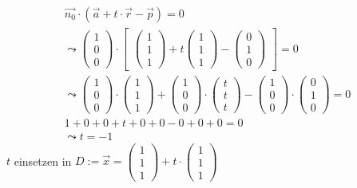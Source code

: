 \begin{gather}
\vec{n_0} \cdot (\vec{a}+t\cdot \vec{r}-\vec{p})=0\\
\leadsto 
\begin{pmatrix}
1\\0\\0
\end{pmatrix} \cdot 
\begin{bmatrix}
\begin{pmatrix}
1\\1\\1
\end{pmatrix}
+ t
\begin{pmatrix}
1\\1\\1
\end{pmatrix}
-
\begin{pmatrix}
0\\1\\0
\end{pmatrix}
\end{bmatrix} = 0\\
\leadsto
\begin{pmatrix}
1\\0\\0
\end{pmatrix}\cdot
\begin{pmatrix}
1\\1\\1
\end{pmatrix}
+
\begin{pmatrix}
1\\0\\0
\end{pmatrix}
\cdot
\begin{pmatrix}
t\\t\\t
\end{pmatrix}
-
\begin{pmatrix}
1\\0\\0
\end{pmatrix}
\cdot
\begin{pmatrix}
0\\1\\0
\end{pmatrix} =0\\
1+0+0+t+0+0-0+0+0=0\\
\leadsto t=-1
\end{gather} 
\ensuremath{t} einsetzen in \ensuremath{D:= \vec{x}=\begin{pmatrix}
		1\\1\\1
	\end{pmatrix} +t\cdot\begin{pmatrix}
		1\\1\\1
\end{pmatrix}}
